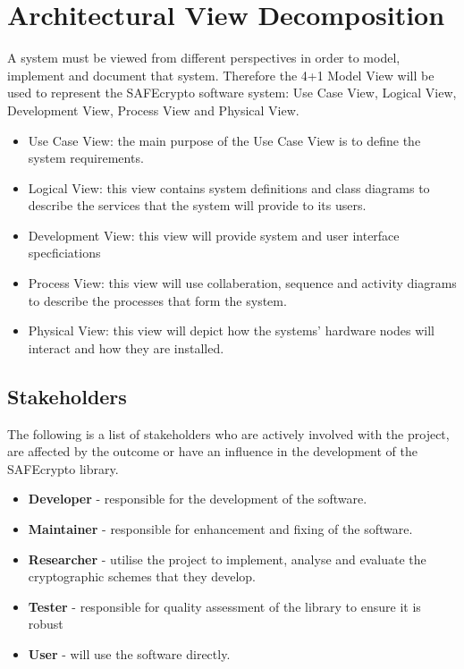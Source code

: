 
\chapter{Architectural View Decomposition}
\label{ch_architectural_view}

A system must be viewed from different perspectives in order to model, implement and document that system. Therefore the 4+1 Model View will be used to represent the SAFEcrypto software system: Use Case View, Logical View, Development View, Process View and Physical View.


\begin{itemize}
	\item Use Case View: the main purpose of the Use Case View is to define the system requirements.
	\item Logical View: this view contains system definitions and class diagrams to describe the services that the system will provide to its users.
	\item Development View: this view will provide system and user interface specficiations
	\item Process View: this view will use collaberation, sequence and activity diagrams to describe the processes that form the system.
	\item Physical View: this view will depict how the systems' hardware nodes will interact and how they are installed.
\end{itemize}


\section{Stakeholders}
\label{sec:stakeholders}

The following is a list of stakeholders who are actively involved with the project, are affected by the outcome or have an influence in the development of the SAFEcrypto library.

\begin{itemize}
	\item \textbf{Developer} - responsible for the development of the software.
	\item \textbf{Maintainer} - responsible for enhancement and fixing of the software.
	\item \textbf{Researcher} - utilise the project to implement, analyse and evaluate the cryptographic schemes that they develop.
	\item \textbf{Tester} - responsible for quality assessment of the library to ensure it is robust
	\item \textbf{User} - will use the software directly.
\end{itemize}

